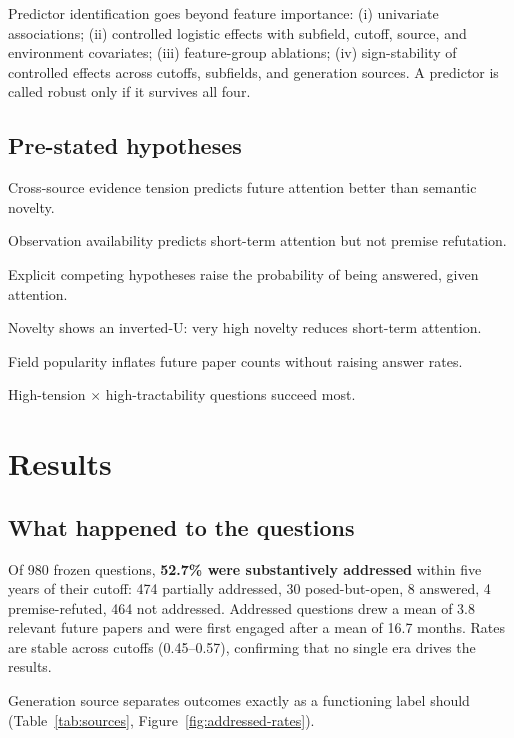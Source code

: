 \documentclass[11pt]{article}
\newcommand{\addressedrate}{52.7\%}
\begin{document}
Predictor identification goes beyond feature importance: (i) univariate
associations; (ii) controlled logistic effects with subfield, cutoff,
source, and environment covariates; (iii) feature-group ablations;
(iv) sign-stability of controlled effects across cutoffs, subfields, and
generation sources. A predictor is called robust only if it survives all
four.

\subsection*{Pre-stated hypotheses}

\begin{description}[style=multiline,labelwidth=1.6em,leftmargin=2.2em]
  \item[H1] Cross-source evidence tension predicts future attention
    better than semantic novelty.
  \item[H2] Observation availability predicts short-term attention but
    not premise refutation.
  \item[H3] Explicit competing hypotheses raise the probability of being
    answered, given attention.
  \item[H4] Novelty shows an inverted-U: very high novelty reduces
    short-term attention.
  \item[H5] Field popularity inflates future paper counts without
    raising answer rates.
  \item[H6] High-tension $\times$ high-tractability questions succeed
    most.
\end{description}

\section{Results}

\subsection{What happened to the questions}

Of 980 frozen questions, \textbf{\addressedrate{} were substantively
addressed} within five years of their cutoff: 474 partially addressed,
30 posed-but-open, 8 answered, 4 premise-refuted, 464 not addressed.
Addressed questions drew a mean of 3.8 relevant future papers and were
first engaged after a mean of 16.7 months. Rates are stable across
cutoffs (0.45--0.57), confirming that no single era drives the results.

Generation source separates outcomes exactly as a functioning label
should (Table~\ref{tab:sources}, Figure~\ref{fig:addressed-rates}).
\end{document}
